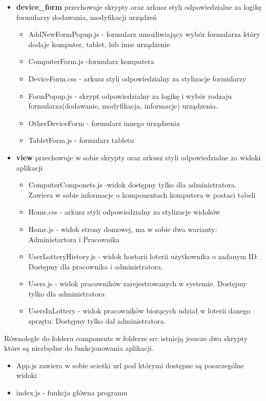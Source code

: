 \begin {itemize}
\begin{itemize}
	\item CpuForm.js - formularz procesora
	\item RamForm.js - formularz pamięci RAM
	\item StorageForm.js - formularz pamięcu dyskowej
	\end{itemize}
\item \textbf{device\_form} przechowuje skrypty oraz arkusz styli odpowiedzialne za logikę formularzy dodawania, modyfikacji urządzeń
	\begin{itemize}
	\item AddNewFormPopup.js - formularz umożliwiający wybór formularza który dodaje komputer, tablet, lub inne urządzenie
	\item ComputerForm.js -formularz komputera
	\item DeviceForm.css - arkusz styli odpowiedzialny za stylizacje formularzy
	\item FormPopup.js - skrypt odpowiedzialny za logikę i wybór rodzaju formularza(dodawanie, modyfikacja, informacje) urządzenia.
	\item OtherDeviceForm - formularz innego urządzenia
	\item TabletForm.js - formularz tabletu
	\end{itemize}
\item \textbf{view} przechowuje w sobie skrypty oraz arkusz styli odpowiedzialne za widoki aplikacji
	\begin{itemize}
	\item ComputerComponets.js -widok dostępny tylko dla administratora. Zawiera w sobie informacje o komponentach komputera w postaci tabeli
	\item Home.css - arkusz styli odpowiedzialny za stylizacje widoków
	\item Home.js - widok strony domowej, ma w sobie dwa warianty: Administartora i Pracownika
	\item UserLotteryHistory.js - widok hostorii loterii użytkownika o zadanym ID. Dostępny dla pracownika i administratora.
	\item Users.js - widok pracowników zarejestrowanych w systemie. Dostępny tylko dla administratora
	\item UsersInLottery - widok pracowników biorących udział w loterii danego sprzętu. Dostępny tylko dal administratora.
	\end{itemize}
\end{itemize}

Równolegle do folderu components w folderze src istnieją jeszcze dwa skrypty które są niezbędne do funkcjonowania aplikacji.
\begin{itemize}
	\item App.js zawiera w sobie scieżki url pod którymi dostępne są poszczególne widoki
	\item index.js - funkcja główna programu
\end{itemize}


